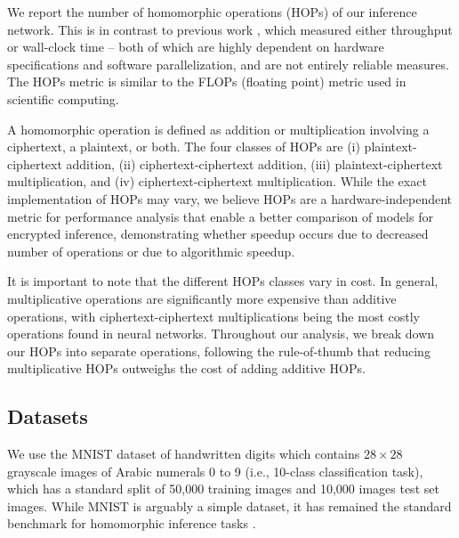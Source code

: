 \documentclass[conference]{IEEEtran}
\begin{document}


We report the number of homomorphic operations (HOPs) of our inference network.
This is in contrast to previous work \cite{gilad2016cryptonets,chabanne2017privacy,hesamifard2017cryptodl}, which measured either throughput or wall-clock time -- both of which are highly dependent on hardware specifications and software parallelization, and are not entirely reliable measures.
The HOPs metric is similar to the FLOPs (floating point) metric used in scientific computing.

A homomorphic operation is defined as addition or multiplication involving a ciphertext, a plaintext, or both.
The four classes of HOPs are (i) plaintext-ciphertext addition, (ii) ciphertext-ciphertext addition, (iii) plaintext-ciphertext multiplication, and (iv) ciphertext-ciphertext multiplication.
While the exact implementation of HOPs may vary, we believe HOPs are a hardware-independent metric for performance analysis that enable a better comparison of models for encrypted inference, demonstrating whether speedup occurs due to decreased number of operations or due to algorithmic speedup.

It is important to note that the different HOPs classes vary in cost.  In general, multiplicative operations are significantly more expensive than additive operations, with ciphertext-ciphertext multiplications being the most costly operations found in neural networks.  Throughout our analysis, we break down our HOPs into separate operations, following the rule-of-thumb that reducing multiplicative HOPs outweighs the cost of adding additive HOPs.


\subsection{Datasets}
We use the MNIST dataset of handwritten digits \cite{lecun1995convolutional} which contains $28 \times 28$ grayscale images of Arabic numerals 0 to 9 (i.e., 10-class classification task), which has a standard split of 50,000 training images and 10,000 images test set images.
While MNIST is arguably a simple dataset, it has remained the standard benchmark for homomorphic inference tasks \cite{gilad2016cryptonets, hesamifard2017cryptodl}.
\end{document}
